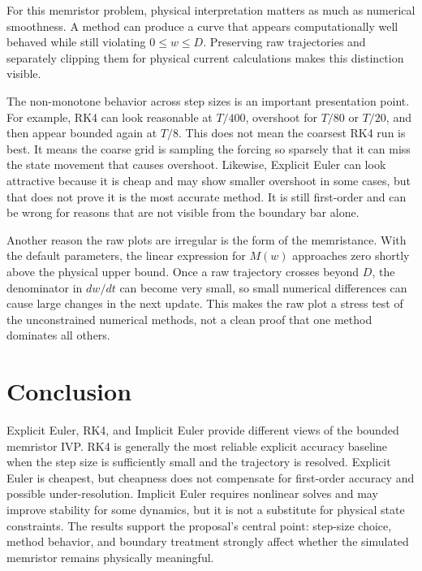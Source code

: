 \documentclass[11pt]{article}
\begin{document}
For this memristor problem, physical interpretation matters as much as numerical smoothness. A method can produce a curve that appears computationally well behaved while still violating \(0 \leq w \leq D\). Preserving raw trajectories and separately clipping them for physical current calculations makes this distinction visible.

The non-monotone behavior across step sizes is an important presentation point. For example, RK4 can look reasonable at \(T/400\), overshoot for \(T/80\) or \(T/20\), and then appear bounded again at \(T/8\). This does not mean the coarsest RK4 run is best. It means the coarse grid is sampling the forcing so sparsely that it can miss the state movement that causes overshoot. Likewise, Explicit Euler can look attractive because it is cheap and may show smaller overshoot in some cases, but that does not prove it is the most accurate method. It is still first-order and can be wrong for reasons that are not visible from the boundary bar alone.

Another reason the raw plots are irregular is the form of the memristance. With the default parameters, the linear expression for \(M(w)\) approaches zero shortly above the physical upper bound. Once a raw trajectory crosses beyond \(D\), the denominator in \(dw/dt\) can become very small, so small numerical differences can cause large changes in the next update. This makes the raw plot a stress test of the unconstrained numerical methods, not a clean proof that one method dominates all others.

\section{Conclusion}

Explicit Euler, RK4, and Implicit Euler provide different views of the bounded memristor IVP. RK4 is generally the most reliable explicit accuracy baseline when the step size is sufficiently small and the trajectory is resolved. Explicit Euler is cheapest, but cheapness does not compensate for first-order accuracy and possible under-resolution. Implicit Euler requires nonlinear solves and may improve stability for some dynamics, but it is not a substitute for physical state constraints. The results support the proposal's central point: step-size choice, method behavior, and boundary treatment strongly affect whether the simulated memristor remains physically meaningful.
\end{document}
